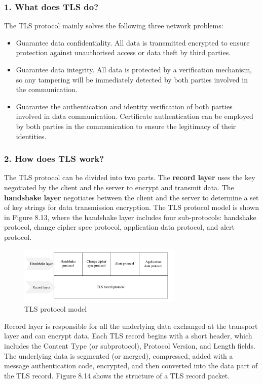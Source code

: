 \documentclass[a4paper,12pt,openany]{book}
\begin{document}
\subsubsection{1. What does TLS do?}
The TLS protocol mainly solves the following three network problems:

\begin{itemize}[leftmargin=1.5em,noitemsep]
    \item Guarantee data confidentiality. All data is transmitted encrypted to ensure protection against unauthorised access or data theft by third parties.
    \item Guarantee data integrity. All data is protected by a verification mechanism, so any tampering will be immediately detected by both parties involved in the communication.
    \item Guarantee the authentication and identity verification of both parties involved in data communication. Certificate authentication can be employed by both parties in the communication to ensure the legitimacy of their identities.
\end{itemize}

\subsubsection{2. How does TLS work?}
The TLS protocol can be divided into two parts. The \textbf{record layer} uses the key negotiated by the client and the server to encrypt and transmit data. The \textbf{handshake layer} negotiates between the client and the server to determine a set of key strings for data transmission encryption. The TLS protocol model is shown in Figure 8.13, where the handshake layer includes four sub-protocols: handshake protocol, change cipher spec protocol, application data protocol, and alert protocol.

\begin{figure}[!h]
    \centering
    \includegraphics[width=0.7\textwidth]{D8Z/8-13}
    \caption{TLS protocol model}
\end{figure}

Record layer is responsible for all the underlying data exchanged at the transport layer and can encrypt data. Each TLS record begins with a short header, which includes the Content Type (or subprotocol), Protocol Version, and Length fields. The underlying data is segmented (or merged), compressed, added with a message authentication code, encrypted, and then converted into the data part of the TLS record. Figure 8.14 shows the structure of a TLS record packet.
\end{document}
